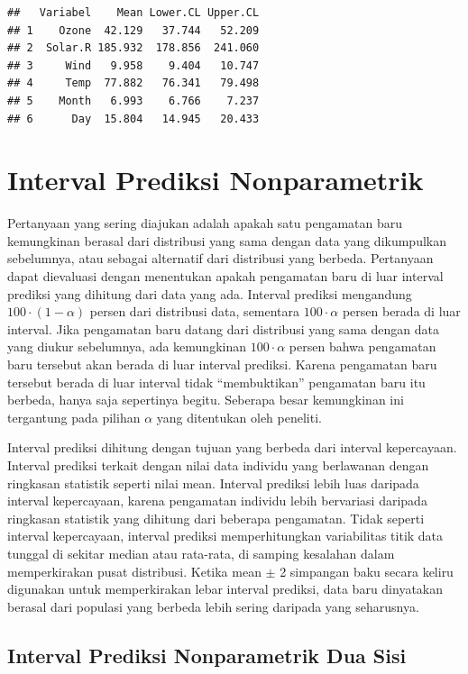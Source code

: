 \documentclass[]{book}
\begin{document}
\begin{verbatim}
##   Variabel    Mean Lower.CL Upper.CL
## 1    Ozone  42.129   37.744   52.209
## 2  Solar.R 185.932  178.856  241.060
## 3     Wind   9.958    9.404   10.747
## 4     Temp  77.882   76.341   79.498
## 5    Month   6.993    6.766    7.237
## 6      Day  15.804   14.945   20.433
\end{verbatim}

\section{Interval Prediksi
Nonparametrik}\label{interval-prediksi-nonparametrik}

Pertanyaan yang sering diajukan adalah apakah satu pengamatan baru
kemungkinan berasal dari distribusi yang sama dengan data yang
dikumpulkan sebelumnya, atau sebagai alternatif dari distribusi yang
berbeda. Pertanyaan dapat dievaluasi dengan menentukan apakah pengamatan
baru di luar interval prediksi yang dihitung dari data yang ada.
Interval prediksi mengandung \(100\cdot\left(1-\alpha\right)\) persen
dari distribusi data, sementara \(100\cdot\alpha\) persen berada di luar
interval. Jika pengamatan baru datang dari distribusi yang sama dengan
data yang diukur sebelumnya, ada kemungkinan \(100\cdot\alpha\) persen
bahwa pengamatan baru tersebut akan berada di luar interval prediksi.
Karena pengamatan baru tersebut berada di luar interval tidak
``membuktikan'' pengamatan baru itu berbeda, hanya saja sepertinya
begitu. Seberapa besar kemungkinan ini tergantung pada pilihan
\(\alpha\) yang ditentukan oleh peneliti.

Interval prediksi dihitung dengan tujuan yang berbeda dari interval
kepercayaan. Interval prediksi terkait dengan nilai data individu yang
berlawanan dengan ringkasan statistik seperti nilai mean. Interval
prediksi lebih luas daripada interval kepercayaan, karena pengamatan
individu lebih bervariasi daripada ringkasan statistik yang dihitung
dari beberapa pengamatan. Tidak seperti interval kepercayaan, interval
prediksi memperhitungkan variabilitas titik data tunggal di sekitar
median atau rata-rata, di samping kesalahan dalam memperkirakan pusat
distribusi. Ketika mean \(\pm\) 2 simpangan baku secara keliru digunakan
untuk memperkirakan lebar interval prediksi, data baru dinyatakan
berasal dari populasi yang berbeda lebih sering daripada yang
seharusnya.

\subsection{Interval Prediksi Nonparametrik Dua
Sisi}\label{interval-prediksi-nonparametrik-dua-sisi}
\end{document}
